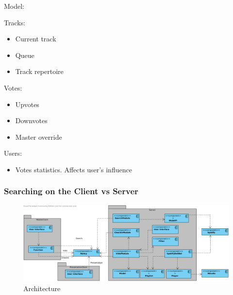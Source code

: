 \label{sec:architecture}


Model:

Tracks:
\begin{itemize}
  \item Current track
  \item Queue
  \item Track repertoire
\end{itemize}

Votes:
\begin{itemize}
  \item Upvotes
  \item Downvotes
  \item Master override
\end{itemize}

Users:
\begin{itemize}
  \item Votes statistics. Affects user's influence
\end{itemize}

\subsubsection{Searching on the Client vs Server}

\begin{figure}
  \centering
  \includegraphics[width=0.7\linewidth]{Images/architecture.png}
  \caption{Architecture}
  \label{fig:architecture}
\end{figure}
	
